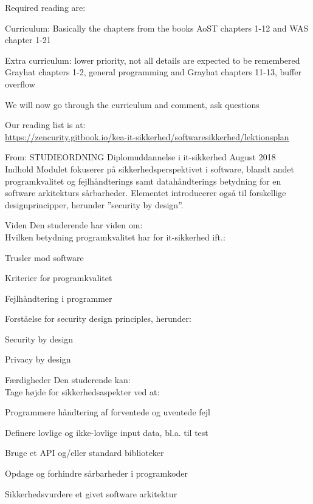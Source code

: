 \documentclass[Screen16to9,17pt]{foils}
\begin{document}
Required reading are:
\begin{list2}
\item Curriculum: Basically the chapters from the books AoST chapters 1-12 and WAS chapter 1-21
\item Extra curriculum: lower priority, not all details are expected to be remembered
Grayhat chapters 1-2, general programming and
Grayhat chapters 11-13, buffer overflow
\item We will now go through the curriculum and comment, ask questions
\end{list2}

Our reading list is at:\\
{\small\url{https://zencurity.gitbook.io/kea-it-sikkerhed/softwaresikkerhed/lektionsplan}}



From: STUDIEORDNING Diplomuddannelse i it-sikkerhed August 2018\\
Indhold
Modulet fokuserer på sikkerhedsperspektivet i software, blandt andet
programkvalitet og fejlhåndterings samt datahåndterings betydning for en
software arkitekturs sårbarheder.
Elementet introducerer også til forskellige designprincipper, herunder ”security by design”.

Viden  Den studerende har viden om:\\
Hvilken betydning programkvalitet har for it-sikkerhed ift.:
\begin{list2}
\item Trusler mod software
\item Kriterier for programkvalitet
\item Fejlhåndtering i programmer
\item Forståelse for security design principles, herunder:
\item Security by design
\item Privacy by design
\end{list2}

Færdigheder Den studerende kan:\\
Tage højde for sikkerhedsaspekter ved at:
\begin{list2}
\item Programmere håndtering af forventede og uventede fejl
\item Definere lovlige og ikke-lovlige input data, bl.a. til test
\item Bruge et API og/eller standard biblioteker
\item Opdage og forhindre sårbarheder i programkoder
\item Sikkerhedsvurdere et givet software arkitektur
\end{list2}
\end{document}
